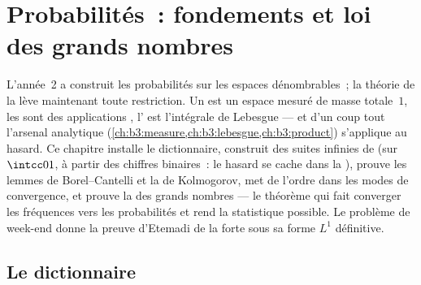 \chapter{Probabilités~: fondements et loi des grands
nombres}\label{ch:b3:probability}

L'année~2 a construit les probabilités sur les espaces
dénombrables~; la théorie de la  lève maintenant toute
restriction. Un  est un espace mesuré de
masse totale~$1$, les  sont des
applications , l' est l'intégrale de
Lebesgue --- et d'un coup tout l'arsenal analytique
(\cref{ch:b3:measure,ch:b3:lebesgue,ch:b3:product}) s'applique
au hasard. Ce chapitre installe le dictionnaire, construit des
suites infinies de   (sur
$\intcc01$, à partir des chiffres binaires~: le hasard se
cache dans la ), prouve les lemmes de
Borel--Cantelli et la  de Kolmogorov, met de
l'ordre dans les modes de convergence, et prouve la  des
grands nombres --- le théorème qui fait converger les
fréquences vers les probabilités et rend la statistique
possible. Le problème de week-end donne la preuve d'Etemadi
de la  forte sous sa forme $L^1$ définitive.

\section{Le dictionnaire}

